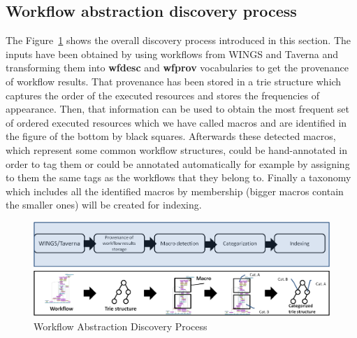 \subsection{Workflow abstraction discovery process}
The Figure~\ref{fig:workflowAbstraction} shows the overall discovery process introduced in this section. The inputs have been obtained by using workflows from WINGS and Taverna and transforming them into \textbf{wfdesc} and \textbf{wfprov} vocabularies to get the provenance of workflow results. That provenance has been stored in a trie structure which captures the order of the executed resources and stores the frequencies of appearance. Then, that information can be used to obtain the most frequent set of ordered executed resources which we have called macros and are identified in the figure of the bottom by black squares. Afterwards these detected macros, which represent some common workflow structures, could be hand-annotated in order to tag them or could be annotated automatically for example by assigning to them the same tags as the workflows that they belong to. Finally a taxonomy which includes all the identified macros by membership (bigger macros contain the smaller ones) will be created for indexing.

\begin{figure}
\begin{center}
	\includegraphics[scale=0.5]{./Figures/workflowAbstraction}
		\caption{Workflow Abstraction Discovery Process}
		\label{fig:workflowAbstraction}
\end{center}
\end{figure}